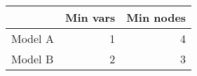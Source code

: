 
\begin{tabular}{l|r|r}
\hline
  & Min vars & Min nodes\\
\hline
Model A & 1 & 4\\
\hline
Model B & 2 & 3\\
\hline
\end{tabular}